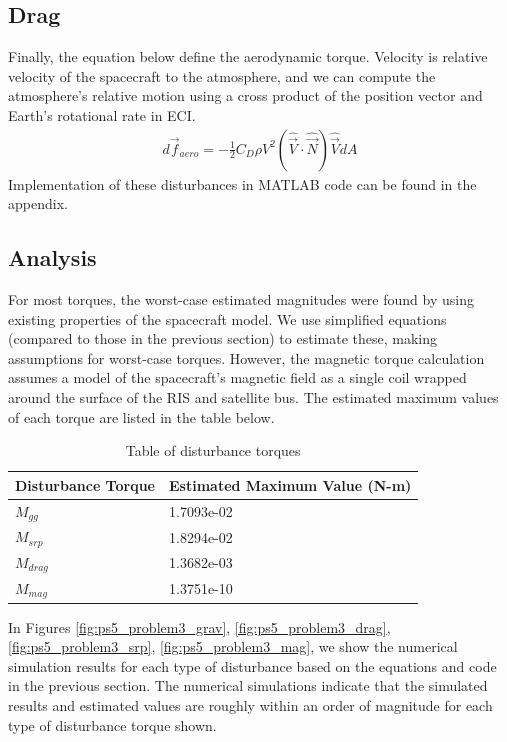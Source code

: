 \subsection{Drag}
Finally, the equation below define the aerodynamic torque. Velocity is relative velocity of the spacecraft to the atmosphere, and we can compute the atmosphere's relative motion using a cross product of the position vector and Earth's rotational rate in ECI.
\begin{align*}
    d \Vec{f}_{aero} = - \frac{1}{2} C_D \rho V^2 (\hat{\Vec{V}} \cdot \hat{\Vec{N}}) \hat{\Vec{V}} dA
\end{align*}
Implementation of these disturbances in MATLAB code can be found in the appendix.

\subsection{Analysis}
For most torques, the worst-case estimated magnitudes were found by using existing properties of the spacecraft model. We use simplified equations (compared to those in the previous section) to estimate these, making assumptions for worst-case torques. However, the magnetic torque calculation assumes a model of the spacecraft's magnetic field as a single coil wrapped around the surface of the RIS and satellite bus. The estimated maximum values of each torque are listed in the table below.

\begin{table}[H]
\caption{Table of disturbance torques}
\centering
\begin{tabular}{l|l} 

Disturbance Torque & Estimated Maximum Value (N-m)  \\ 
\hline
$M_{gg}$          & 1.7093e-02                  \\ 
\hline
$M_{srp}$         & 1.8294e-02                  \\ 
\hline
$M_{drag}$        & 1.3682e-03                  \\ 
\hline
$M_{mag}$         & 1.3751e-10                  \\
\end{tabular}
\end{table}

In Figures \ref{fig:ps5_problem3_grav}, \ref{fig:ps5_problem3_drag}, \ref{fig:ps5_problem3_srp}, \ref{fig:ps5_problem3_mag}, we show the numerical simulation results for each type of disturbance based on the equations and code in the previous section. The numerical simulations indicate that the simulated results and estimated values are roughly within an order of magnitude for each type of disturbance torque shown.

